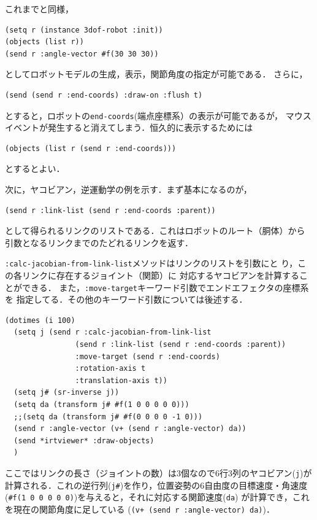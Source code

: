 これまでと同様，
{\baselineskip=10pt
\begin{verbatim}
(setq r (instance 3dof-robot :init))
(objects (list r))
(send r :angle-vector #f(30 30 30))
\end{verbatim}
}
としてロボットモデルの生成，表示，関節角度の指定が可能である．
さらに，

{\baselineskip=10pt
\begin{verbatim}
(send (send r :end-coords) :draw-on :flush t)
\end{verbatim}
}

とすると，ロボットの\verb|end-coords|(端点座標系）の表示が可能であるが，
マウスイベントが発生すると消えてしまう．恒久的に表示するためには

{\baselineskip=10pt
\begin{verbatim}
(objects (list r (send r :end-coords)))
\end{verbatim}
}

とするとよい．

次に，ヤコビアン，逆運動学の例を示す．まず基本になるのが，
{\baselineskip=10pt
\begin{verbatim}
(send r :link-list (send r :end-coords :parent))
\end{verbatim}
}
として得られるリンクのリストである．これはロボットのルート（胴体）から
引数となるリンクまでのたどれるリンクを返す．

\verb|:calc-jacobian-from-link-list|メソッドはリンクのリストを引数にと
り，この各リンクに存在するジョイント（関節）に
対応するヤコビアンを計算することができる．
また，\verb|:move-target|キーワード引数でエンドエフェクタの座標系を
指定してる．その他のキーワード引数については後述する．

{\baselineskip=10pt
\begin{verbatim}
(dotimes (i 100)
  (setq j (send r :calc-jacobian-from-link-list
                (send r :link-list (send r :end-coords :parent))
                :move-target (send r :end-coords)
                :rotation-axis t
                :translation-axis t))
  (setq j# (sr-inverse j))
  (setq da (transform j# #f(1 0 0 0 0 0)))
  ;;(setq da (transform j# #f(0 0 0 0 -1 0)))
  (send r :angle-vector (v+ (send r :angle-vector) da))
  (send *irtviewer* :draw-objects)
  )
\end{verbatim}
}

ここではリンクの長さ（ジョイントの数）は3個なので6行3列のヤコビアン(\verb|j|)が
計算される．これの逆行列(\verb|j#|)を作り，位置姿勢の6自由度の目標速度・角速度
(\verb|#f(1 0 0 0 0 0)|)を与えると，それに対応する関節速度(\verb|da|)
が計算でき，これを現在の関節角度に足している
(\verb|(v+ (send r :angle-vector) da)|)．


